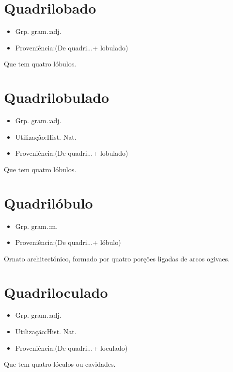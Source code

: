 \section{Quadrilobado}
\begin{itemize}
\item {Grp. gram.:adj.}
\end{itemize}
\begin{itemize}
\item {Proveniência:(De \textunderscore quadri...\textunderscore  + \textunderscore lobulado\textunderscore )}
\end{itemize}
Que tem quatro lóbulos.
\section{Quadrilobulado}
\begin{itemize}
\item {Grp. gram.:adj.}
\end{itemize}
\begin{itemize}
\item {Utilização:Hist. Nat.}
\end{itemize}
\begin{itemize}
\item {Proveniência:(De \textunderscore quadri...\textunderscore  + \textunderscore lobulado\textunderscore )}
\end{itemize}
Que tem quatro lóbulos.
\section{Quadrilóbulo}
\begin{itemize}
\item {Grp. gram.:m.}
\end{itemize}
\begin{itemize}
\item {Proveniência:(De \textunderscore quadri...\textunderscore  + \textunderscore lóbulo\textunderscore )}
\end{itemize}
Ornato architectónico, formado por quatro porções ligadas de arcos ogivaes.
\section{Quadriloculado}
\begin{itemize}
\item {Grp. gram.:adj.}
\end{itemize}
\begin{itemize}
\item {Utilização:Hist. Nat.}
\end{itemize}
\begin{itemize}
\item {Proveniência:(De \textunderscore quadri...\textunderscore  + \textunderscore loculado\textunderscore )}
\end{itemize}
Que tem quatro lóculos ou cavidades.
